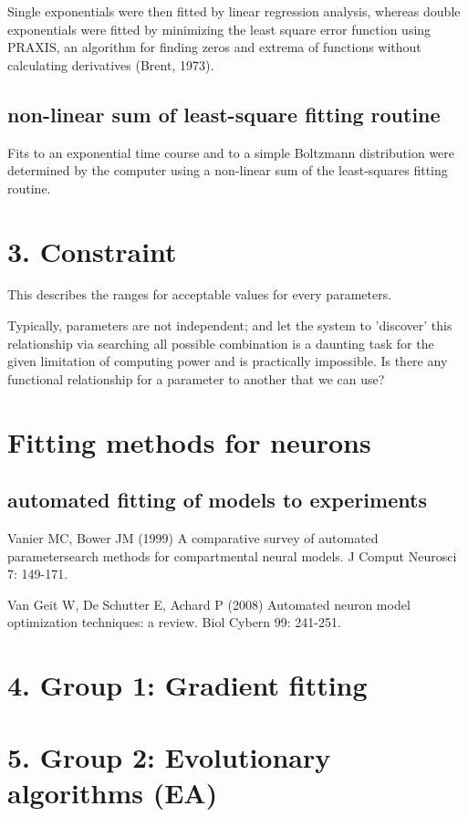 Single exponentials were then fitted by linear regression analysis, whereas
double exponentials were fitted by minimizing the least square error function
using PRAXIS, an algorithm for finding zeros and extrema of functions without
calculating derivatives (Brent, 1973).


\subsection{non-linear sum of least-square fitting routine}

Fits to an exponential time course and to a simple Boltzmann distribution were
determined by the computer using a non-linear sum of the least-squares fitting
routine.

\section{3. Constraint}

This describes the ranges for acceptable values for every parameters.

Typically, parameters are not independent; and let the system to 'discover' this
relationship via searching all possible combination is a daunting task for the
given limitation of computing power and is practically impossible. Is there any
functional relationship for a parameter to another that we can use?



\section{Fitting methods for neurons}
\subsection{automated fitting of models to experiments}

Vanier MC, Bower JM (1999) A comparative survey of automated parametersearch
methods for compartmental neural models. J Comput Neurosci 7:
149-171.

Van Geit W, De Schutter E, Achard P (2008) Automated neuron model
optimization techniques: a review. Biol Cybern 99: 241-251.



\section{4. Group 1: Gradient fitting}
\section{5. Group 2: Evolutionary algorithms (EA)}
\label{sec:Evolutionary-algorithm}


